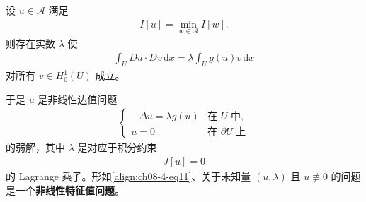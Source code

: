 \documentclass[../../main.tex]{subfiles}
\begin{document}
\begin{theorem}[Lagrange 乘子]\label{theorem:ch08-4-2-Lagrange乘子}
设 $u\in\mathcal{A}$ 满足
\begin{align}
I[u]=\min_{w\in\mathcal{A}}I[w].\label{align:ch08-4-eq09}
\end{align}
则存在实数 $\lambda$ 使
\begin{align}
\int_U Du\cdot Dv\,\mathrm{d}x=\lambda\int_U g(u)v\,\mathrm{d}x\label{align:ch08-4-eq10}
\end{align}
对所有 $v\in H_0^1(U)$ 成立。

\begin{remark}\label{remark:ch08-4-1-非线性特征值}
于是 $u$ 是非线性边值问题
\begin{align}
\begin{cases}
-\Delta u=\lambda g(u)&\text{在 }U\text{ 中},\\
u=0&\text{在 }\partial U\text{ 上}
\end{cases}\label{align:ch08-4-eq11}
\end{align}
的弱解，其中 $\lambda$ 是对应于积分约束
\begin{align}
J[u]=0\label{align:ch08-4-eq12}
\end{align}
的 Lagrange 乘子。形如\eqref{align:ch08-4-eq11}、关于未知量 $(u,\lambda)$ 且 $u\not\equiv 0$ 的问题是一个\textbf{非线性特征值问题}。
\end{remark}


\end{theorem}
\end{document}
